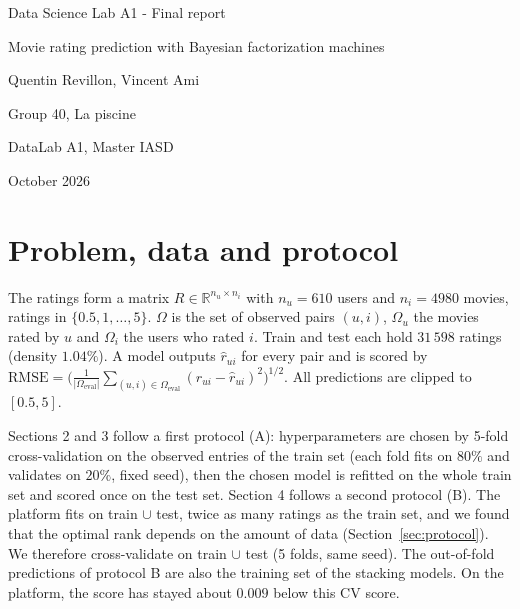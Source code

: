 \documentclass[11pt,a4paper]{article}
\newcommand{\R}{\mathbb{R}}
\newcommand{\rhat}{\hat r}
\begin{document}
\begin{titlepage}
\centering\sffamily
\vspace*{\fill}
{\color{accent}\huge Data Science Lab A1 - Final report\par}
\vspace{0.4cm}
{\color{accent}\Large Movie rating prediction with Bayesian factorization machines\par}
\vspace{2cm}
{\Large Quentin Revillon, Vincent Ami\par}
\vspace{0.3cm}
{\large Group 40, La piscine\par}
\vspace{1.2cm}
{DataLab A1, Master IASD\par}
\vspace{1cm}
{\Large October 2026\par}
\vspace*{\fill}
\begin{minipage}{0.7\linewidth}
\small
\setcounter{tocdepth}{1}
\renewcommand{\contentsname}{\normalsize Contents}
\tableofcontents
\end{minipage}
\vspace{1cm}
\end{titlepage}

\section{Problem, data and protocol}

The ratings form a matrix $R \in \R^{n_u \times n_i}$ with $n_u = 610$ users and $n_i = 4980$ movies,
ratings in $\{0.5, 1, \dots, 5\}$. $\Omega$ is the set of observed pairs $(u,i)$, $\Omega_u$ the movies
rated by $u$ and $\Omega_i$ the users who rated $i$. Train and test each hold $31\,598$ ratings (density
$1.04\%$). A model outputs $\rhat_{ui}$ for every pair and is scored by
$\mathrm{RMSE} = \big(\frac{1}{|\Omega_{\text{eval}}|}\sum_{(u,i)\in\Omega_{\text{eval}}} (r_{ui}-\rhat_{ui})^2\big)^{1/2}$.
All predictions are clipped to $[0.5, 5]$.

Sections 2 and 3 follow a first protocol (A): hyperparameters are chosen by 5-fold cross-validation on the
observed entries of the train set (each fold fits on $80\%$ and validates on $20\%$, fixed seed), then the chosen
model is refitted on the whole train set and scored once on the test set. Section 4 follows a second protocol (B).
The platform fits on train $\cup$ test, twice as many ratings as the train set, and we found that the optimal
rank depends on the amount of data (Section~\ref{sec:protocol}). We therefore cross-validate on train $\cup$ test (5 folds,
same seed). The out-of-fold predictions of protocol B are also the training set of the stacking models.
On the platform, the score has stayed about $0.009$ below this CV score.
\end{document}
